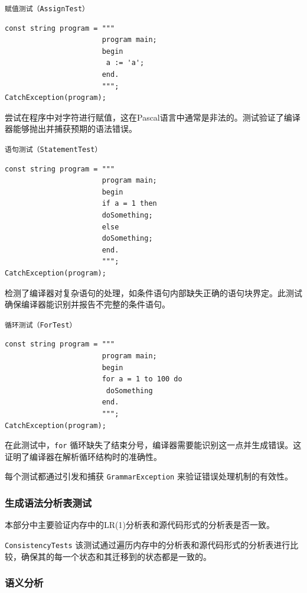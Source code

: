 \documentclass[../main.tex]{subfiles}
\begin{document}
\texttt{赋值测试（AssignTest）}
\begin{lstlisting}[style=csharp]
const string program = """
                       program main;
                       begin
                        a := 'a';
                       end.
                       """;
CatchException(program);
\end{lstlisting}
尝试在程序中对字符进行赋值，这在Pascal语言中通常是非法的。测试验证了编译器能够抛出并捕获预期的语法错误。

\texttt{语句测试（StatementTest）}
\begin{lstlisting}[style=csharp]
const string program = """
                       program main;
                       begin
                       if a = 1 then
                       doSomething;
                       else
                       doSomething;
                       end.
                       """;
CatchException(program);
\end{lstlisting}
检测了编译器对复杂语句的处理，如条件语句内部缺失正确的语句块界定。此测试确保编译器能识别并报告不完整的条件语句。

\texttt{循环测试（ForTest）}
\begin{lstlisting}[style=csharp]
const string program = """
                       program main;
                       begin
                       for a = 1 to 100 do
                        doSomething
                       end.
                       """;
CatchException(program);
\end{lstlisting}
在此测试中，\texttt{for} 循环缺失了结束分号，编译器需要能识别这一点并生成错误。这证明了编译器在解析循环结构时的准确性。

每个测试都通过引发和捕获 \texttt{GrammarException} 来验证错误处理机制的有效性。

\subsubsection{生成语法分析表测试}

本部分中主要验证内存中的LR(1)分析表和源代码形式的分析表是否一致。

\texttt{ConsistencyTests} 该测试通过遍历内存中的分析表和源代码形式的分析表进行比较，确保其的每一个状态和其迁移到的状态都是一致的。



\subsubsection{语义分析}
\end{document}
